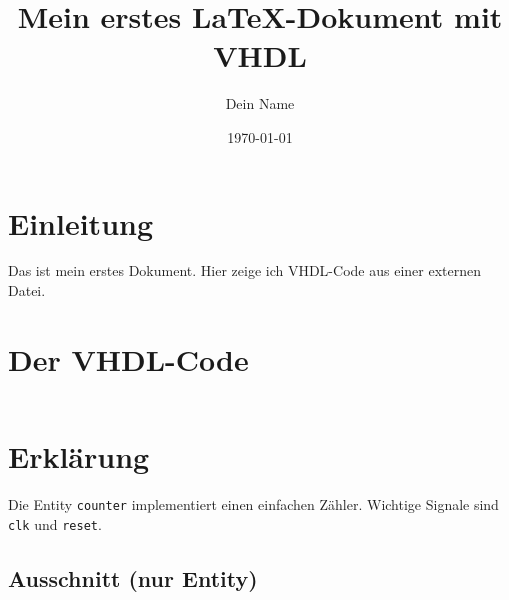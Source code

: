 \documentclass[12pt,a4paper]{article}
\title{Mein erstes LaTeX-Dokument mit VHDL}
\author{Dein Name}
\date{\today}
\begin{document}
\maketitle

\section{Einleitung}
Das ist mein erstes Dokument. Hier zeige ich VHDL-Code aus einer externen Datei.

\section{Der VHDL-Code}

\inputminted{vhdl}{../rtl/slave.vhd}

\section{Erklärung}
Die Entity \texttt{counter} implementiert einen einfachen Zähler. 
Wichtige Signale sind \texttt{clk} und \texttt{reset}.

\subsection{Ausschnitt (nur Entity)}
\inputminted[firstline=5, lastline=12]{vhdl}{../rtl/slave.vhd}
\end{document}
